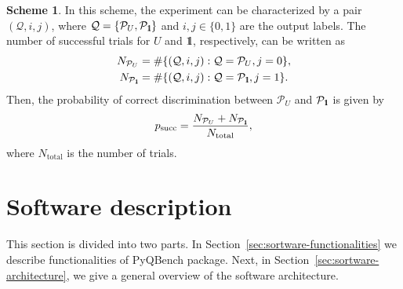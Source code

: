 \documentclass[preprint,12pt, a4paper, dvipsnames]{elsarticle}
\newcommand{\ket}[1]{\ensuremath{|#1\rangle}}
\newcommand{\bra}[1]{\ensuremath{\langle#1|}}
\newcommand{\ketbra}[2]{\ensuremath{\ket{#1}\bra{#2}}}
\newcommand{\proj}[1]{\ensuremath{\ketbra{#1}{#1}}}
\newcommand{\1}{{\rm 1\hspace{-0.9mm}l}}
\newcommand{\Id}{{\rm 1\hspace{-0.9mm}l}}
\newcommand{\PP}{\mathcal{P}}
\newcommand{\QQ}{\mathcal{Q}}
\theoremstyle{definition}
\newtheorem{scheme}{Scheme}
\begin{document}
\begin{scheme}
	In this scheme, the experiment can be characterized by a pair $(\mathcal{Q}, i,j)$, where
	$\mathcal{Q} = \{ \PP_{U}, \PP_{\Id} \}$ and $i,j \in \{0,1\}$ are the output labels. The number
	of successful trials for $U$ and $\Id$, respectively, can be written  as
	\begin{eqnarray}
	N_{\PP_U} &= \#\{(\mathcal{Q},  i, j): \mathcal{Q} = \PP_U, j = 0\}, \\
	N_{\PP_\Id} &= \#\{(\mathcal{Q},  i, j): \mathcal{Q} = \PP_\Id, j = 1\}.
	\end{eqnarray}
	Then, the probability of correct discrimination between $\PP_{U} $ and $\PP_\Id$ is given by
	\begin{equation}
	p_{\text{succ}} = \frac{N_{\PP_{U}} + N_{\PP_{\Id}}}{N_{\text{total}}},
	\end{equation}
	where $N_{\text{total}}$ is the number of trials.
\end{scheme}



 \section{Software description}
 \label{}
 This section is divided into two parts.
 In Section~\ref{sec:sortware-functionalities} we describe functionalities of PyQBench
 package. Next, in Section~\ref{sec:sortware-architecture}, we give a general overview of the
 software architecture.
\end{document}
